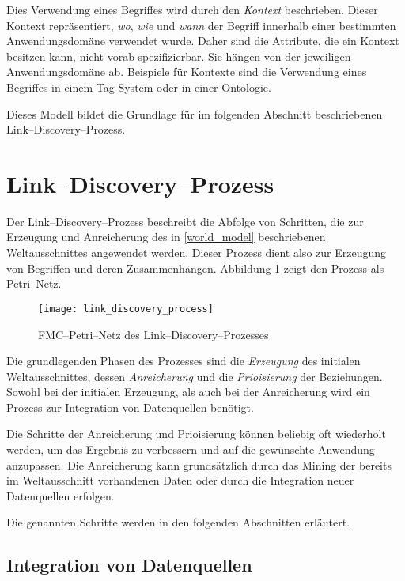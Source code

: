 Dies Verwendung eines Begriffes wird durch den \emph{Kontext} beschrieben. Dieser Kontext repräsentiert, \emph{wo}, \emph{wie} und \emph{wann} der Begriff innerhalb einer bestimmten Anwendungsdomäne verwendet wurde. Daher sind die Attribute, die ein Kontext besitzen kann, nicht vorab spezifizierbar. Sie hängen von der jeweiligen Anwendungsdomäne ab. Beispiele für Kontexte sind die Verwendung eines Begriffes in einem Tag-System oder in einer Ontologie.

Dieses Modell bildet die Grundlage für  im folgenden Abschnitt beschriebenen Link--Discovery--Prozess.

\section{Link--Discovery--Prozess}
\label{ld_process}

Der Link--Discovery--Prozess beschreibt die Abfolge von Schritten, die zur Erzeugung und Anreicherung des in \ref{world_model} beschriebenen Weltausschnittes angewendet werden. Dieser Prozess dient also zur Erzeugung von Begriffen und deren Zusammenhängen. Abbildung \ref{fig:link_discovery_process} zeigt den Prozess als Petri--Netz.

\begin{figure}
\centering
\texttt{[image: link\_discovery\_process]}
\caption{FMC--Petri--Netz des Link--Discovery--Prozesses}
\label{fig:link_discovery_process}
\end{figure}

Die grundlegenden Phasen des Prozesses sind die \emph{Erzeugung} des initialen Weltausschnittes, dessen \emph{Anreicherung} und die \emph{Prioisierung} der Beziehungen. Sowohl bei der initialen Erzeugung, als auch bei der Anreicherung wird ein Prozess zur Integration von Datenquellen benötigt.

Die Schritte der Anreicherung und Prioisierung können beliebig oft wiederholt werden, um das Ergebnis zu verbessern und auf die gewünschte Anwendung anzupassen. Die Anreicherung kann grundsätzlich durch das Mining der bereits im Weltausschnitt vorhandenen Daten oder durch die Integration neuer Datenquellen erfolgen.

Die genannten Schritte werden in den folgenden Abschnitten erläutert.

\subsection{Integration von Datenquellen}
\label{integration_generic}

